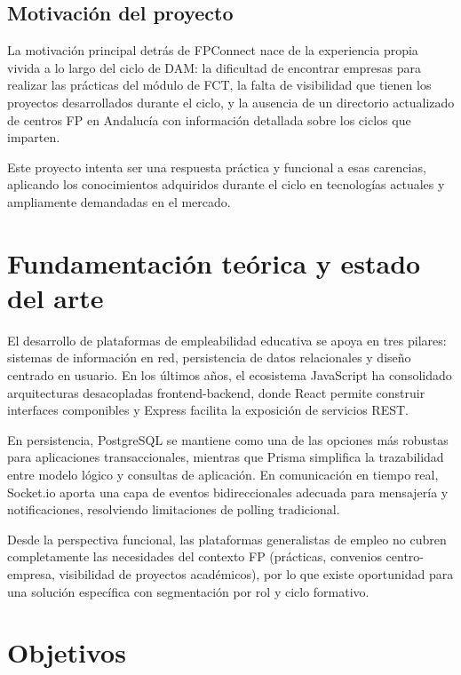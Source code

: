 \documentclass[12pt, a4paper]{report}
\begin{document}
\section{Motivación del proyecto}

La motivación principal detrás de FPConnect nace de la experiencia propia vivida a lo largo del ciclo
de DAM: la dificultad de encontrar empresas para realizar las prácticas del módulo de FCT, la falta de
visibilidad que tienen los proyectos desarrollados durante el ciclo, y la ausencia de un directorio
actualizado de centros FP en Andalucía con información detallada sobre los ciclos que imparten.

Este proyecto intenta ser una respuesta práctica y funcional a esas carencias, aplicando los
conocimientos adquiridos durante el ciclo en tecnologías actuales y ampliamente demandadas en el
mercado.

\chapter{Fundamentación teórica y estado del arte}

El desarrollo de plataformas de empleabilidad educativa se apoya en tres pilares: sistemas de
información en red, persistencia de datos relacionales y diseño centrado en usuario. En los últimos
años, el ecosistema JavaScript ha consolidado arquitecturas desacopladas frontend-backend, donde
React permite construir interfaces componibles y Express facilita la exposición de servicios REST.

En persistencia, PostgreSQL se mantiene como una de las opciones más robustas para aplicaciones
transaccionales, mientras que Prisma simplifica la trazabilidad entre modelo lógico y consultas de
aplicación. En comunicación en tiempo real, Socket.io aporta una capa de eventos bidireccionales
adecuada para mensajería y notificaciones, resolviendo limitaciones de polling tradicional.

Desde la perspectiva funcional, las plataformas generalistas de empleo no cubren completamente las
necesidades del contexto FP (prácticas, convenios centro-empresa, visibilidad de proyectos académicos),
por lo que existe oportunidad para una solución específica con segmentación por rol y ciclo formativo.

\chapter{Objetivos}
\end{document}
